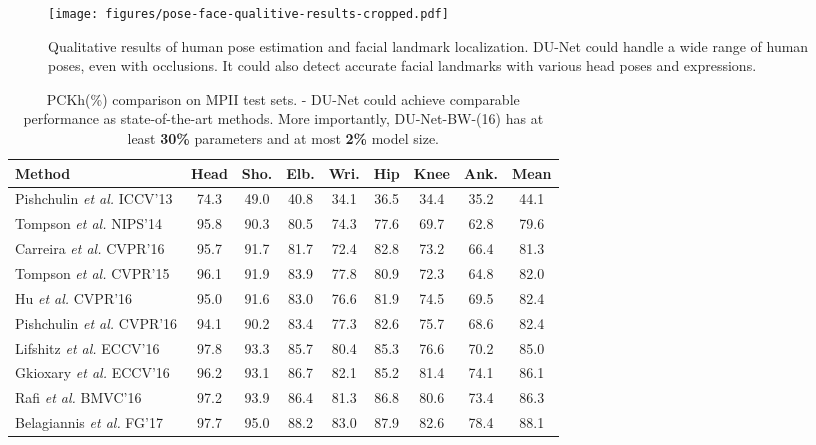 \documentclass[runningheads]{llncs}
\begin{document}
\begin{figure*}[t!]
\centering
  \texttt{[image: figures/pose-face-qualitive-results-cropped.pdf]}
\caption{Qualitative results of human pose estimation and facial landmark localization. DU-Net could handle a wide range of human poses, even with occlusions. It could also detect accurate facial landmarks with various head poses and expressions.}
\label{fig:pose-face-qualitive}
\end{figure*}

\begin{table}[t!]
\begin{center}
\small
\setlength\tabcolsep{1.5pt}
\caption{PCKh(\%) comparison on MPII test sets. - DU-Net could achieve comparable performance as state-of-the-art methods. More importantly, DU-Net-BW-(16) has at least {\bf 30\%} parameters and at most {\bf 2\%} model size.}\label{tb:mpii}
\begin{tabular}{@{}lcccccccc@{}}
\toprule
Method & Head & Sho. & Elb. & Wri. & Hip & Knee & Ank. & Mean\\
\hline
Pishchulin \textit{et al.} ICCV'13 \cite{pishchulin2013strong} & 74.3 & 49.0 & 40.8 & 34.1 & 36.5 & 34.4 & 35.2 & 44.1\\
Tompson \textit{et al. } NIPS'14 \cite{tompson2014joint} & 95.8 & 90.3 & 80.5 & 74.3 & 77.6 & 69.7 & 62.8 & 79.6\\
Carreira \textit{et al.} CVPR'16 \cite{carreira2016human} & 95.7 & 91.7 & 81.7 & 72.4 & 82.8 & 73.2 & 66.4 & 81.3\\
Tompson \textit{et al.} CVPR'15 \cite{tompson2015efficient}& 96.1 & 91.9 & 83.9 & 77.8 & 80.9 & 72.3 & 64.8 & 82.0\\
Hu \textit{et al.} CVPR'16 \cite{hu2016bottom}& 95.0 & 91.6 & 83.0 & 76.6 & 81.9 & 74.5 & 69.5 & 82.4\\
Pishchulin \textit{et al.} CVPR'16 \cite{pishchulin2016deepcut}&94.1 & 90.2 & 83.4 & 77.3 & 82.6 & 75.7 & 68.6 & 82.4\\
Lifshitz \textit{et al.} ECCV'16 \cite{lifshitz2016human} & 97.8 & 93.3 & 85.7 & 80.4 & 85.3 & 76.6 & 70.2 & 85.0\\
Gkioxary \textit{et al.} ECCV'16 \cite{gkioxari2016chained} & 96.2 & 93.1 & 86.7 & 82.1 & 85.2 & 81.4 & 74.1 & 86.1\\
Rafi \textit{et al.} BMVC'16 \cite{rafi2016efficient} & 97.2 & 93.9 & 86.4 & 81.3 & 86.8 & 80.6 & 73.4 & 86.3\\
Belagiannis \textit{et al.} FG'17 \cite{belagiannis2017recurrent}&97.7 & 95.0 & 88.2 & 83.0 & 87.9 & 82.6 & 78.4 & 88.1\\

\end{tabular}
\end{center}
\end{table}
\end{document}
